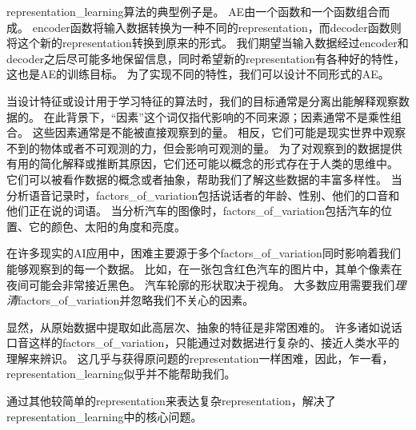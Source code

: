 \gls{representation_learning}算法的典型例子是。
\gls{AE}由一个函数和一个函数组合而成。
\gls{encoder}函数将输入数据转换为一种不同的\gls{representation}，而\gls{decoder}函数则将这个新的\gls{representation}转换到原来的形式。
我们期望当输入数据经过\gls{encoder}和\gls{decoder}之后尽可能多地保留信息，同时希望新的\gls{representation}有各种好的特性，
这也是\gls{AE}的训练目标。
为了实现不同的特性，我们可以设计不同形式的\gls{AE}。

当设计特征或设计用于学习特征的算法时，我们的目标通常是分离出能解释观察数据的。
在此背景下，``因素''这个词仅指代影响的不同来源；因素通常不是乘性组合。
这些因素通常是不能被直接观察到的量。
相反，它们可能是现实世界中观察不到的物体或者不可观测的力，但会影响可观测的量。
为了对观察到的数据提供有用的简化解释或推断其原因，它们还可能以概念的形式存在于人类的思维中。
它们可以被看作数据的概念或者抽象，帮助我们了解这些数据的丰富多样性。
当分析语音记录时，\gls{factors_of_variation}包括说话者的年龄、性别、他们的口音和他们正在说的词语。
当分析汽车的图像时，\gls{factors_of_variation}包括汽车的位置、它的颜色、太阳的角度和亮度。


在许多现实的\gls{AI}应用中，困难主要源于多个\gls{factors_of_variation}同时影响着我们能够观察到的每一个数据。
比如，在一张包含红色汽车的图片中，其单个像素在夜间可能会非常接近黑色。
汽车轮廓的形状取决于视角。
大多数应用需要我们\emph{理清}\gls{factors_of_variation}并忽略我们不关心的因素。

显然，从原始数据中提取如此高层次、抽象的特征是非常困难的。
许多诸如说话口音这样的\gls{factors_of_variation}，只能通过对数据进行复杂的、接近人类水平的理解来辨识。
这几乎与获得原问题的\gls{representation}一样困难，因此，乍一看，\gls{representation_learning}似乎并不能帮助我们。

通过其他较简单的\gls{representation}来表达复杂\gls{representation}，解决了\gls{representation_learning}中的核心问题。


